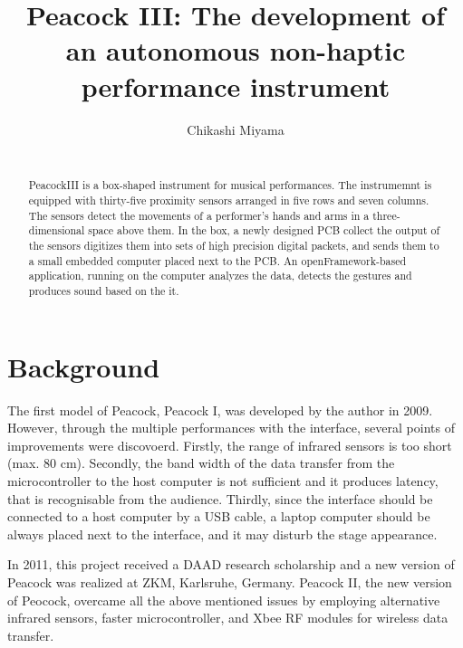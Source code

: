 \documentclass{nime-alternate}
\begin{document}

\title{Peacock III: The development of an autonomous non-haptic performance instrument}
\author{
\alignauthor
Chikashi Miyama\\
       \\
}

\maketitle
\begin{abstract}
PeacockIII is a box-shaped instrument for musical performances. The instrumemnt is equipped with thirty-five proximity sensors arranged in five rows and seven columns. The sensors detect the movements of a performer's hands and arms in a three-dimensional space above them. In the box, a newly designed PCB collect the output of the sensors  digitizes them into sets of high precision digital packets, and sends them to a small embedded computer placed next to the PCB. An openFramework-based application, running on the computer analyzes the data, detects the gestures and produces sound based on the it.  
\end{abstract}


\section{Background}

The first model of Peacock, Peacock I,  was developed by the author in 2009\cite{miyama:peacock}. However, through the multiple performances with the interface, several points of improvements were discovoerd. Firstly, the range of infrared sensors is too short (max. 80 cm). Secondly, the band width of the data transfer from the microcontroller to the host computer is not sufficient and it produces latency, that is recognisable from the audience. Thirdly, since the interface should be connected to a host computer by a USB cable, a laptop computer should be always placed next to the interface, and it may disturb the stage appearance.

In 2011, this project received a DAAD research scholarship and a new version of Peacock was realized at ZKM, Karlsruhe, Germany. Peacock II, the new version of Peocock, overcame all the above mentioned issues by employing alternative infrared sensors, faster microcontroller, and Xbee RF modules for wireless data transfer.
\end{document}
